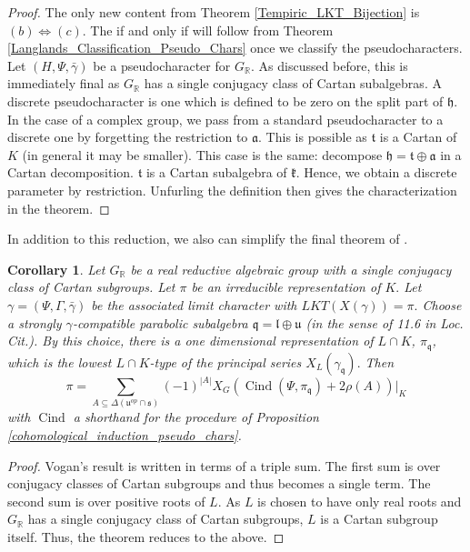 \documentclass[letterpaper,twosided,11pt]{article}
\theoremstyle{plain}
\newtheorem{corollary}[theorem]{Corollary}
\theoremstyle{definition}
\theoremstyle{remark}
\newcommand{\R}{\mathbb{R}}
\newcommand{\ds}{\oplus}
\newcommand{\lie}[1]{\mathfrak{#1}}
\begin{document}
\begin{proof}
    The only new content from Theorem \ref{Tempiric_LKT_Bijection} is $
    (b)\iff (c). $ The if and only if will follow from Theorem \ref{Langlands_Classification_Pseudo_Chars}
    once we classify the pseudocharacters.  Let $ (H,\Psi,\bar{\gamma}) $
    be a pseudocharacter for $ G_\R. $ As discussed before, this is
    immediately final as $ G_\R $ has a single conjugacy class of Cartan
    subalgebras.  A discrete pseudocharacter is one which is defined to
    be zero on the split part of $ \lie{h}. $ In the case of a complex
    group, we pass from a standard pseudocharacter to a discrete one by
    forgetting the restriction to $ \lie{a}. $ This is possible as $
    \lie{t} $ is a Cartan of $ K $ (in general it may be smaller).  This
    case is the same:  decompose $ \lie{h}=\lie{t}\ds \lie{a} $ in a
    Cartan decomposition.  $ \lie{t} $ is a Cartan subalgebra of $ \lie{k}.
    $ Hence, we obtain a discrete parameter by restriction.  Unfurling
    the definition then gives the characterization in the theorem.
\end{proof}

In addition to this reduction, we also can simplify the final theorem of
\cite{Vogan2007}.

\begin{corollary}
    \cite[Theorem 16.6]{Vogan2007}%
    \label{K_as_Tempirics} Let $ G_\R $ be a real reductive algebraic
    group with a single conjugacy class of Cartan subgroups.  Let $ \pi $
    be an irreducible representation of $ K. $ Let $ \gamma=(\Psi,
    \Gamma, \bar{\gamma}) $ be the associated limit character with $ LKT
    (X(\gamma))=\pi. $ Choose a strongly $ \gamma $-compatible parabolic
    subalgebra $ \lie{q}=\lie{l}\ds \lie{u} $ (in the sense of 11.6 in
    Loc.  Cit.).  By this choice, there is a one dimensional
    representation of $ L\cap K $, $ \pi_\lie{q} $, which is the lowest $
    L\cap K $-type of the principal series $ X_L(\gamma_\lie{q}). $ Then
    \[
        \pi=\sum_{A\subseteq \Delta(\lie{u}^{op}\cap \lie{s})} (-1)^{|A|}X_G
        (
        \operatorname{Cind}
        (\Psi, \pi_\lie{q})+2\rho(A))|_K
    \]
    with $\operatorname{Cind}$ a shorthand for the procedure of Proposition \ref{cohomological_induction_pseudo_chars}. 
\end{corollary}
\begin{proof}
    Vogan's result is written in terms of a triple sum.  The first sum
    is over conjugacy classes of Cartan subgroups and thus becomes a
    single term.  The second sum is over positive roots of $ L. $ As $ L
    $ is chosen to have only real roots and $ G_\R $ has a single
    conjugacy class of Cartan subgroups, $ L $ is a Cartan subgroup
    itself.  Thus, the theorem reduces to the above.
\end{proof}
\end{document}
